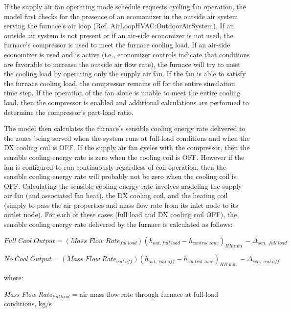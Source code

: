 If the supply air fan operating mode schedule requests cycling fan operation, the model first checks for the presence of an ecomomizer in the outside air system serving the furnace's air loop (Ref. AirLoopHVAC:OutdoorAirSystem). If an outside air system is not present or if an air-side economizer is not used, the furnace's compressor is used to meet the furnace cooling load. If an air-side economizer is used and is active (i.e., economizer controls indicate that conditions are favorable to increase the outside air flow rate), the furnace will try to meet the cooling load by operating only the supply air fan. If the fan is able to satisfy the furnace cooling load, the compressor remains off for the entire simulation time step. If the operation of the fan alone is unable to meet the entire cooling load, then the compressor is enabled and additional calculations are performed to determine the compressor's part-load ratio.

The model then calculates the furnace's sensible cooling energy rate delivered to the zones being served when the system runs at full-load conditions and when the DX cooling coil is OFF. If the supply air fan cycles with the compressor, then the sensible cooling energy rate is zero when the cooling coil is OFF. However if the fan is configured to run continuously regardless of coil operation, then the sensible cooling energy rate will probably not be zero when the cooling coil is OFF. Calculating the sensible cooling energy rate involves modeling the supply air fan (and associated fan heat), the DX cooling coil, and the heating coil (simply to pass the air properties and mass flow rate from its inlet node to its outlet node). For each of these cases (full load and DX cooling coil OFF), the sensible cooling energy rate delivered by the furnace is calculated as follows:

\begin{equation}
Full\;Cool\;Output = (Mass\;Flow\;Rat{e_{ful\;load}}){({h_{out,full\;load}} - {h_{control\;zone}})_{HR\min }} - {\Delta_{sen,\;full\;load}}
\end{equation}

\begin{equation}
No\;Cool\;Output = (Mass\;Flow\;Rat{e_{coil\;off}}){({h_{out,\;coil\;off}} - {h_{control\;zone}})_{HR\min }} - {\Delta_{sen,\;coil\;off}}
\end{equation}

where:

\emph{Mass Flow Rate\(_{full\, load}\)} = air mass flow rate through furnace at full-load conditions, kg/s

